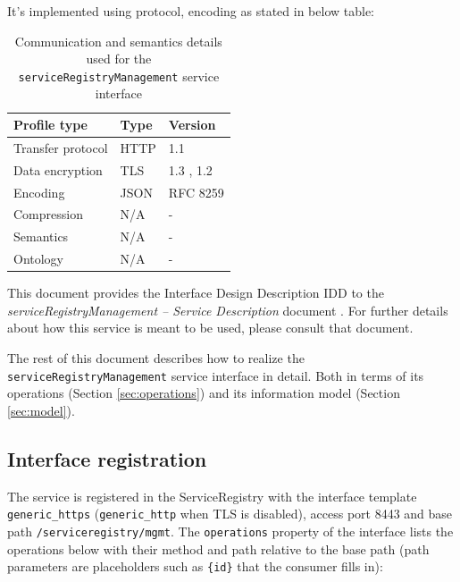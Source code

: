 \documentclass[a4paper]{arrowhead}
\begin{document}
It's implemented using protocol, encoding as stated in below table:
\begin{table}[ht!]
  \centering
  \begin{tabular}{|l|l|l|}
    \hline
    \rowcolor{gray!33} Profile type & Type & Version \\ \hline
    Transfer protocol & HTTP & 1.1 \cite{rfc9112} \\ \hline
    Data encryption & TLS & 1.3 \cite{rfc8446}, 1.2 \cite{rfc5246} \\ \hline
    Encoding & JSON & RFC 8259 \cite{rfc8259} \\ \hline
    Compression & N/A & - \\ \hline
    Semantics & N/A & - \\ \hline
    Ontology & N/A & - \\ \hline
  \end{tabular}
  \caption{Communication and semantics details used for the \texttt{service\allowbreak{}Registry\allowbreak{}Management} service interface}
  \label{tab:comunication_semantics_profile}
\end{table}

This document provides the Interface Design Description IDD to the \textit{serviceRegistryManagement -- Service Description} document \cite{sr-serviceRegistryManagement-sd}.
For further details about how this service is meant to be used, please consult that document.

The rest of this document describes how to realize the \texttt{service\allowbreak{}Registry\allowbreak{}Management} service
interface in detail. Both in terms of its operations (Section \ref{sec:operations}) and its information model (Section \ref{sec:model}).

\subsection{Interface registration}

The service is registered in the ServiceRegistry with the interface template \texttt{generic\_\allowbreak{}https} (\texttt{generic\_\allowbreak{}http} when TLS is disabled), access port 8443 and base path \texttt{/\allowbreak{}serviceregistry/\allowbreak{}mgmt}. The \texttt{operations} property of the interface lists the operations below with their method and path relative to the base path (path parameters are placeholders such as \texttt{\{id\}} that the consumer fills in):
\end{document}
